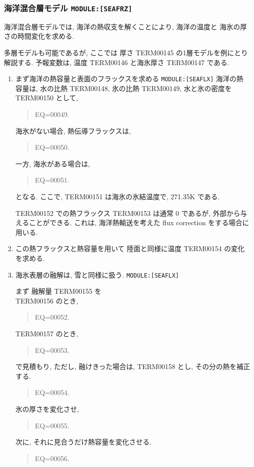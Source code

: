 \subsubsection{海洋混合層モデル \texttt{MODULE:[SEAFRZ]}}

海洋混合層モデルでは,
海洋の熱収支を解くことにより, 海洋の温度と
海氷の厚さの時間変化を求める.

多層モデルも可能であるが,
ここでは 厚さ TERM00145 の1層モデルを例にとり解説する.
予報変数は, 温度 TERM00146 と海氷厚さ TERM00147 である.

\begin{enumerate}
\item  まず海洋の熱容量と表面のフラックスを求める
       \texttt{MODULE:[SEAFLX]}
海洋の熱容量は,
水の比熱 TERM00148, 氷の比熱 TERM00149, 水と氷の密度を TERM00150 として,
\begin{quote}
EQ=00049.
\end{quote}

海氷がない場合, 熱伝導フラックスは,
\begin{quote}
EQ=00050.
\end{quote}
一方, 海氷がある場合は,
\begin{quote}
EQ=00051.
\end{quote}
となる. ここで, TERM00151 は海氷の氷結温度で, 271.35K である.

TERM00152 での熱フラックス TERM00153 は通常 0 であるが,
外部から与えることができる.
これは, 海洋熱輸送を考えた flux correction をする場合に用いる.

\item この熱フラックスと熱容量を用いて
      陸面と同様に温度 TERM00154 の変化を求める.

\item 海氷表層の融解は, 雪と同様に扱う.
       \texttt{MODULE:[SEAFLX]}

まず 融解量 TERM00155 を  \\
TERM00156 のとき, 
\begin{quote}
EQ=00052.
\end{quote}
TERM00157 のとき, 
\begin{quote}
EQ=00053.
\end{quote}
で見積もり,
ただし, 融けきった場合は, TERM00158 とし, その分の熱を補正する.
\begin{quote}
EQ=00054.
\end{quote}
氷の厚さを変化させ,
\begin{quote}
EQ=00055.
\end{quote}
次に, それに見合うだけ熱容量を変化させる.
\begin{quote}
EQ=00056.
\end{quote}


\end{enumerate}
